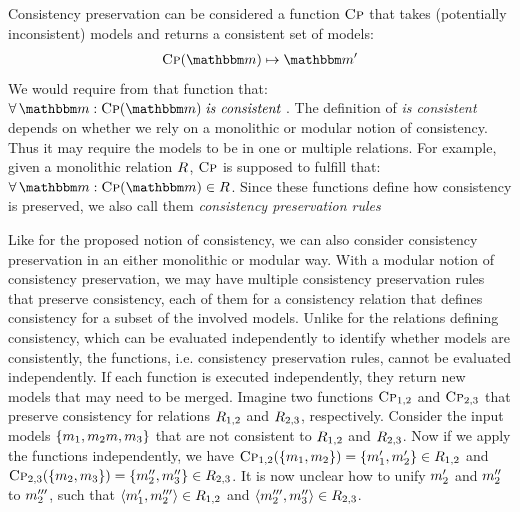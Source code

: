 Consistency preservation can be considered a function $\textsc{Cp}$ that takes (potentially inconsistent) models and returns a consistent set of models:
\begin{align*}
    \function{Cp}(\modelset{m}) \mapsto \modelset{m'}
\end{align*}
We would require from that function that: $\forall \modelset{m} : \function{Cp}(\modelset{m}) \mathtext{is consistent}$.
The definition of \emph{is consistent} depends on whether we rely on a monolithic or modular notion of consistency.
Thus it may require the models to be in one or multiple relations.
For example, given a monolithic relation $R_{}$, $\textsc{Cp}$ is supposed to fulfill that: $\forall \modelset{m} : \function{Cp}(\modelset{m}) \in \consistencyrelation{R}{}$.
Since these functions define how consistency is preserved, we also call them \emph{\glspl{consistency preservation rule}}

Like for the proposed notion of consistency, we can also consider consistency preservation in an either monolithic or modular way.
With a modular notion of consistency preservation, we may have multiple \glspl{consistency preservation rule} that preserve consistency, each of them for a \gls{consistency relation} that defines consistency for a subset of the involved models.
Unlike for the relations defining consistency, which can be evaluated independently to identify whether models are consistently, the functions, i.e. \glspl{consistency preservation rule}, cannot be evaluated independently.
If each function is executed independently, they return new models that may need to be merged. 
Imagine two functions $\textsc{Cp}_{1,2}$ and $\textsc{Cp}_{2,3}$ that preserve consistency for relations $R_{1,2}$ and $R_{2,3}$, respectively.
Consider the input models $\{ m_{1}, m_{2}m, m_{3} \}$ that are not consistent to $R_{1,2}$ and $R_{2,3}$.
Now if we apply the functions independently, we have $\textsc{Cp}_{1,2}(\{ m_{1}, m_{2} \}) = \{ m'_{1}, m'_{2} \} \in R_{1,2}$ and 
$\textsc{Cp}_{2,3}(\{ m_{2}, m_{3} \}) = \{ m''_{2}, m''_{3} \} \in R_{2,3}$.
It is now unclear how to unify $m'_{2}$ and $m''_{2}$ to $m'''_{2}$, such that $\langle m'_{1}, m'''_{2} \rangle \in R_{1,2}$ and  $\langle m'''_{2}, m''_{3} \rangle \in R_{2,3}$.

